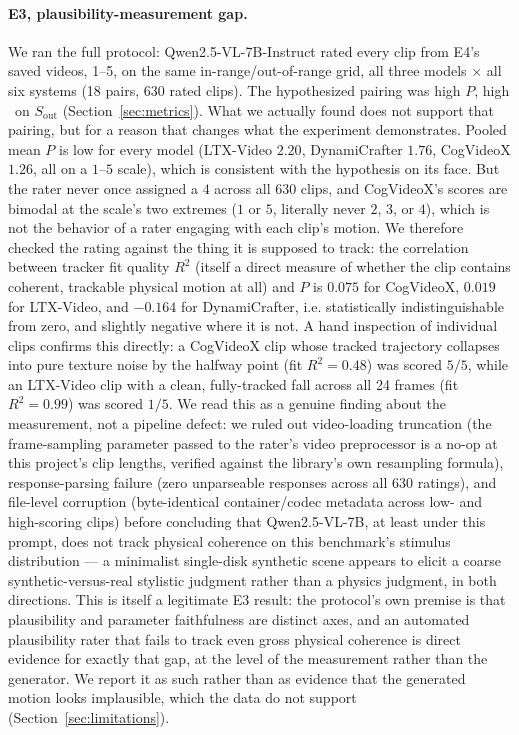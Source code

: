 \paragraph{E3, plausibility-measurement gap.}
We ran the full protocol: Qwen2.5-VL-7B-Instruct \citep{qwen25vl} rated
every clip from E4's saved videos, 1--5, on the same in-range/out-of-range
grid, all three models $\times$ all six systems (18 pairs, 630 rated clips).
The hypothesized pairing was high $P$, high \PRE\ on $S_\text{out}$
(Section~\ref{sec:metrics}). What we actually found does not support that
pairing, but for a reason that changes what the experiment demonstrates.
Pooled mean $P$ is low for every model (LTX-Video $2.20$, DynamiCrafter
$1.76$, CogVideoX $1.26$, all on a $1$--$5$ scale), which is consistent with
the hypothesis on its face. But the rater never once assigned a $4$ across
all $630$ clips, and CogVideoX's scores are bimodal at the scale's two
extremes ($1$ or $5$, literally never $2$, $3$, or $4$), which is not the
behavior of a rater engaging with each clip's motion. We therefore checked
the rating against the thing it is supposed to track: the correlation
between tracker fit quality $R^2$ (itself a direct measure of whether the
clip contains coherent, trackable physical motion at all) and $P$ is
$0.075$ for CogVideoX, $0.019$ for LTX-Video, and $-0.164$ for
DynamiCrafter, i.e. statistically indistinguishable from zero, and slightly
negative where it is not. A hand inspection of individual clips confirms
this directly: a CogVideoX clip whose tracked trajectory collapses into
pure texture noise by the halfway point (fit $R^2=0.48$) was scored $5/5$,
while an LTX-Video clip with a clean, fully-tracked fall
across all 24 frames (fit $R^2=0.99$) was scored $1/5$. We read this as a
genuine finding about the measurement, not a pipeline defect: we ruled out
video-loading truncation (the frame-sampling parameter passed to the
rater's video preprocessor is a no-op at this project's clip lengths, verified
against the library's own resampling formula), response-parsing failure
(zero unparseable responses across all 630 ratings), and file-level
corruption (byte-identical container/codec metadata across low- and
high-scoring clips) before concluding that Qwen2.5-VL-7B, at least under
this prompt, does not track physical coherence on this benchmark's stimulus
distribution --- a minimalist single-disk synthetic scene appears to elicit
a coarse synthetic-versus-real stylistic judgment rather than a physics
judgment, in both directions. This is itself a legitimate E3 result: the
protocol's own premise is that plausibility and parameter faithfulness are
distinct axes, and an automated plausibility rater that fails to track even
gross physical coherence is direct evidence for exactly that gap, at the
level of the measurement rather than the generator. We report it as such
rather than as evidence that the generated motion looks implausible, which
the data do not support (Section~\ref{sec:limitations}).

